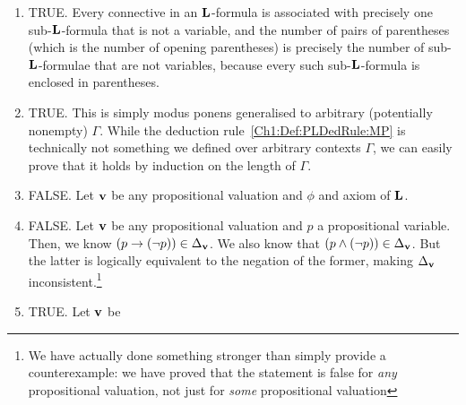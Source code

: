\begin{solution} \hfill
    \begin{enumerate}
        \item TRUE. Every connective in an $\mathbf{L}$-formula is associated with precisely one sub-$\mathbf{L}$-formula that is not a variable, and the number of pairs of parentheses (which is the number of opening parentheses) is precisely the number of sub-$\mathbf{L}$-formulae that are not variables, because every such sub-$\mathbf{L}$-formula is enclosed in parentheses.
        
        \item TRUE. This is simply modus ponens generalised to arbitrary (potentially nonempty) $\Gamma$. While the deduction rule~\ref{Ch1:Def:PLDedRule:MP} is technically not something we defined over arbitrary contexts $\Gamma$, we can easily prove that it holds by induction on the length of $\Gamma$. 
        
        \item FALSE. Let $\mathbf{v}$ be any propositional valuation and $\phi$ and axiom of $\mathbf{L}$.
        
        \item FALSE. Let $\mathbf{v}$ be any propositional valuation and $p$ a propositional variable. Then, we know $\left( p \to \left( \neg p \right) \right) \in \Delta_{\mathbf{v}}$. We also know that $\left( p \land \left( \neg p \right) \right) \in \Delta_{\mathbf{v}}$. But the latter is logically equivalent to the negation of the former, making $\Delta_{\mathbf{v}}$ inconsistent.\footnote{We have actually done something stronger than simply provide a counterexample: we have proved that the statement is false for \textit{any} propositional valuation, not just for \textit{some} propositional valuation}
        
        \item TRUE. Let $\mathbf{v}$ be \sorry %
    \end{enumerate}
\end{solution}


